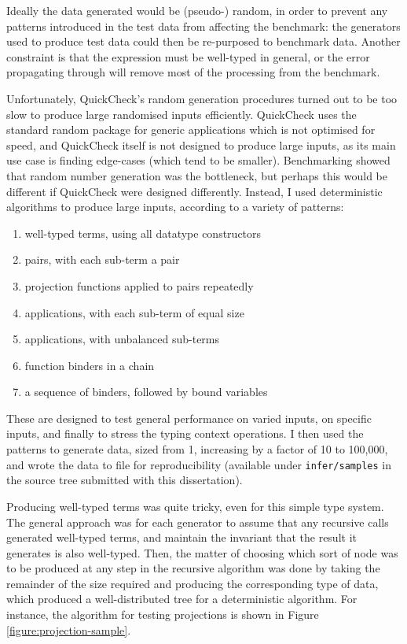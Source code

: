 Ideally the data generated would be (pseudo-) random, in order to prevent any patterns introduced in the test data from affecting the benchmark: the generators used to produce test data could then be re-purposed to benchmark data.
Another constraint is that the expression must be well-typed in general, or the error propagating through will remove most of the processing from the benchmark.

Unfortunately, QuickCheck's random generation procedures turned out to be too slow to produce large randomised inputs efficiently.
QuickCheck uses the standard random package for generic applications which is not optimised for speed, and QuickCheck itself is not designed to produce large inputs, as its main use case is finding edge-cases (which tend to be smaller).
Benchmarking showed that random number generation was the bottleneck, but perhaps this would be different if QuickCheck were designed differently.
Instead, I used deterministic algorithms to produce large inputs, according to a variety of patterns:
\begin{enumerate}
\item well-typed terms, using all datatype constructors
\item pairs, with each sub-term a pair
\item projection functions applied to pairs repeatedly
\item applications, with each sub-term of equal size
\item applications, with unbalanced sub-terms
\item function binders in a chain
\item a sequence of binders, followed by bound variables
\end{enumerate}
These are designed to test general performance on varied inputs, on specific inputs, and finally to stress the typing context operations.
I then used the patterns to generate data, sized from 1, increasing by a factor of 10 to 100,000, and wrote the data to file for reproducibility (available under \texttt{infer/samples} in the source tree submitted with this dissertation).

Producing well-typed terms was quite tricky, even for this simple type system.
The general approach was for each generator to assume that any recursive calls generated well-typed terms, and maintain the invariant that the result it generates is also well-typed.
Then, the matter of choosing which sort of node was to be produced at any step in the recursive algorithm was done by taking the remainder of the size required and producing the corresponding type of data, which produced a well-distributed tree for a deterministic algorithm.
For instance, the algorithm for testing projections is shown in Figure \ref{figure:projection-sample}.

